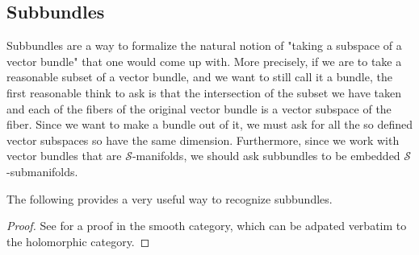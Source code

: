 \subsection{Subbundles}
Subbundles are a way to formalize the natural notion of "taking a subspace of a vector bundle" that one would come up with. More precisely, if we are to take a reasonable subset of a vector bundle, and we want to still call it a bundle, the first reasonable think to ask is that the intersection of the subset we have taken and each of the fibers of the original vector bundle is a vector subspace of the fiber. Since we want to make a bundle out of it, we must ask for all the so defined vector subspaces so have the same dimension. Furthermore, since we work with vector bundles that are \(\mathcal{S}\)-manifolds, we should ask subbundles to be embedded \(\mathcal{S}\)-submanifolds.


The following provides a very useful way to recognize subbundles.

\begin{proof}
    See \parencite[Lemma 10.32]{lee_introSM} for a proof in the smooth category, which can be adpated verbatim to the holomorphic category.
\end{proof}


